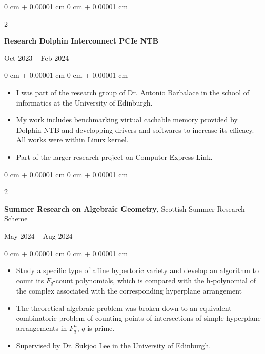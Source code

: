 \documentclass[10pt, a4paper]{article}
\newenvironment{highlights}{
    \begin{itemize}[
        topsep=0.10 cm,
        parsep=0.10 cm,
        partopsep=0pt,
        itemsep=0pt,
        leftmargin=0 cm + 10pt
    ]
}{
    \end{itemize}
} %
\newenvironment{onecolentry}{
    \begin{adjustwidth}{
        0 cm + 0.00001 cm
    }{
        0 cm + 0.00001 cm
    }
}{
    \end{adjustwidth}
} %
\newenvironment{twocolentry}[2][]{
    \onecolentry
    \def\secondColumn{#2}
    \setcolumnwidth{\fill, 4.5 cm}
    \begin{paracol}{2}
}{
    \switchcolumn \raggedleft \secondColumn
    \end{paracol}
    \endonecolentry
} %
\begin{document}
        \begin{twocolentry}{
            Oct 2023 – Feb 2024
        }
            \textbf{Research Dolphin Interconnect PCIe NTB}
		\end{twocolentry}
        \vspace{0.10 cm}
        \begin{onecolentry}
            \begin{highlights}
                \item I was part of the research group of Dr. Antonio Barbalace in the school of informatics at the University of Edinburgh.
				\item My work includes benchmarking virtual cachable memory provided by Dolphin NTB and developping drivers and softwares to increase its efficacy.
				All works were within Linux kernel.
				\item Part of the larger research project on Computer Express Link.
            \end{highlights}
        \end{onecolentry}

        \vspace{0.2 cm}

		\begin{twocolentry}{
	            May 2024 – Aug 2024
	        }
				\textbf{Summer Research on Algebraic Geometry}, Scottish Summer Research Scheme 
			\end{twocolentry}
	        \vspace{0.10 cm}
	        \begin{onecolentry}
	            \begin{highlights}
	                \item Study a specific type of affine hypertoric variety and develop an algorithm to count its $F_q$-count polynomials, which is compared with the h-polynomial of the complex associated with the corresponding hyperplane arrangement
					\item The theoretical algebraic problem was broken down to an equivalent combinatoric problem of counting points of intersections of simple hyperplane arrangements in $F^n_q$, $q$ is prime.
					\item Supervised by Dr. Sukjoo Lee in the University of Edinburgh.
	            \end{highlights}
	        \end{onecolentry}
    
\end{document}
